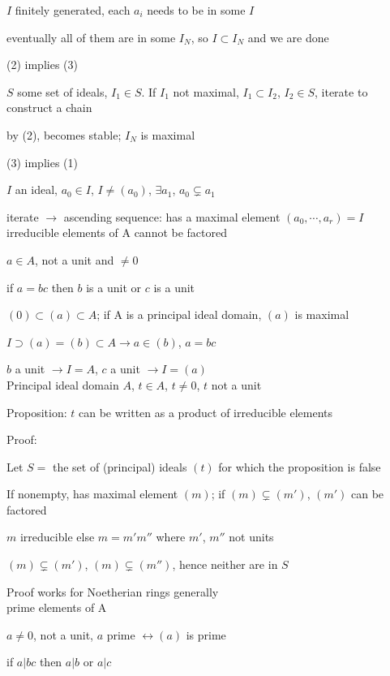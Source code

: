 \documentclass[12pt]{article}
\begin{document}
$I$ finitely generated, each $a_i$ needs to be in some $I$

eventually all of them are in some $I_N$, so $I \subset I_N$ and we are done

\noindent
(2) implies (3)

$S$ some set of ideals, $I_1 \in S$.  If $I_1$ not maximal, $I_1 \subset I_2$, $I_2 \in S$, iterate to construct a chain

by (2), becomes stable; $I_N$ is maximal

\noindent
(3) implies (1)

$I$ an ideal, $a_0 \in I$, $I \neq (a_0)$, $\exists a_1$, $a_0 \subsetneq a_1$

iterate $\to$ ascending sequence: has a maximal element $(a_0, \cdots, a_r) = I$\\

\noindent
irreducible elements of A cannot be factored

$a \in A$, not a unit and $\neq 0$

if $a = bc$ then $b$ is a unit or $c$ is a unit

\noindent
$(0) \subset (a) \subset A$; if A is a principal ideal domain, $(a)$ is maximal

$I \supset (a) = (b) \subset A \to a \in (b)$, $a = bc$

$b$ a unit $\to I = A$, $c$ a unit $\to I = (a)$\\

\noindent
Principal ideal domain $A$, $t \in A$, $t \neq 0$, $t$ not a unit

Proposition: $t$ can be written as a product of irreducible elements

\noindent
Proof:

Let $S=$ the set of (principal) ideals $(t)$ for which the proposition is false

If nonempty, has maximal element $(m)$; if $(m) \subsetneq (m')$, $(m')$ can be factored

$m$ irreducible else $m = m'm''$ where $m'$, $m''$ not units

$(m) \subsetneq (m')$, $(m) \subsetneq (m'')$, hence neither are in $S$

\noindent
Proof works for Noetherian rings generally\\

\noindent
prime elements of A

$a \neq 0$, not a unit, $a$ prime $\leftrightarrow (a)$ is prime

if $a | bc$ then $a | b$ or $a | c$
\end{document}
